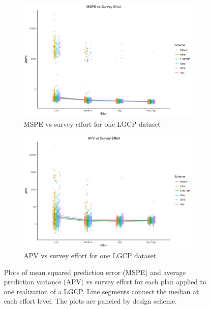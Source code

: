 \documentclass[review]{elsarticle}
\begin{document}
\begin{figure}

\begin{subfigure}{5in}
\includegraphics[width=5in]{../graphics/MSPE-effort-notpaneled-LGCP000004.png}
\caption{MSPE vs survey effort for one LGCP dataset}
\label{mspelgcp}
\end{subfigure}

\begin{subfigure}{5in}
\includegraphics[width=5in]{../graphics/APV-effort-notpaneled-LGCP000004.png}
\caption{APV vs survey effort for one LGCP dataset}
\label{apvlgcp}
\end{subfigure}

\caption{Plots of mean squared prediction error (MSPE) and average prediction
variance (APV) vs survey effort for each plan applied to one realization of a
LGCP. Line segments connect the median at each effort level. The plots are
paneled by design scheme.}
\label{lgcpresults}
\end{figure}
\end{document}
